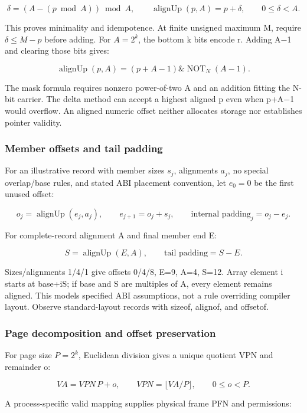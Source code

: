 \[
\delta=(A-(p\bmod A))\bmod A,\qquad
\operatorname{alignUp}(p,A)=p+\delta,\qquad 0\le\delta<A.
\]

This proves minimality and idempotence. At finite unsigned maximum M, require \(\delta\le M-p\) before adding. For \(A=2^k\), the bottom k bits encode r. Adding A−1 and clearing those bits gives:

\[
\operatorname{alignUp}(p,A)=(p+A-1)\mathbin{\&}\operatorname{NOT}_N(A-1).
\]

The mask formula requires nonzero power-of-two A and an addition fitting the N-bit carrier. The delta method can accept a highest aligned p even when p+A−1 would overflow. An aligned numeric offset neither allocates storage nor establishes pointer validity.

\subsubsection{Member offsets and tail padding}\label{member-offsets-and-tail-padding}

For an illustrative record with member sizes \(s_j\), alignments \(a_j\), no special overlap/base rules, and stated ABI placement convention, let \(e_0=0\) be the first unused offset:

\[
o_j=\operatorname{alignUp}(e_j,a_j),\qquad
e_{j+1}=o_j+s_j,\qquad
\text{internal padding}_j=o_j-e_j.
\]

For complete-record alignment A and final member end E:

\[
S=\operatorname{alignUp}(E,A),\qquad
\text{tail padding}=S-E.
\]

Sizes/alignments 1/4/1 give offsets 0/4/8, E=9, A=4, S=12. Array element i starts at base+iS; if base and S are multiples of A, every element remains aligned. This models specified ABI assumptions, not a rule overriding compiler layout. Observe standard-layout records with sizeof, alignof, and offsetof.

\subsubsection{Page decomposition and offset preservation}\label{page-decomposition-and-offset-preservation}

For page size \(P=2^k\), Euclidean division gives a unique quotient VPN and remainder o:

\[
VA=VPN\,P+o,\qquad VPN=\lfloor VA/P\rfloor,\qquad 0\le o<P.
\]

A process-specific valid mapping supplies physical frame PFN and permissions:

